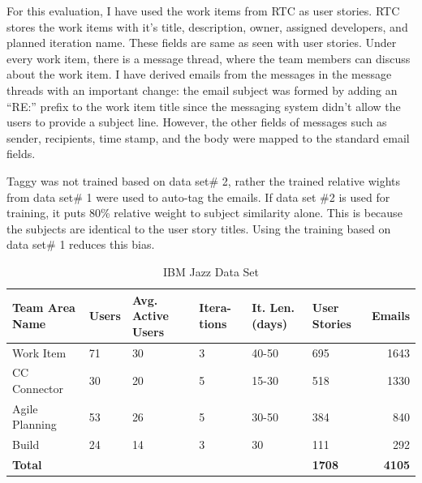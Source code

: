 For this evaluation, I have used the work items from RTC as user stories. RTC stores the work items with it's title, description, owner, assigned developers, and planned iteration name. These fields are same as seen with user stories. Under every work item, there is a message thread, where the team members can discuss about the work item. I have derived emails from the messages in the message threads with an important change: the email subject was formed by adding an ``RE:'' prefix to the work item title since the messaging system didn't allow the users to provide a subject line. However, the other fields of messages such as sender, recipients, time stamp, and the body were mapped to the standard email fields.

Taggy was not trained based on data set\# 2, rather the trained relative wights from data set\# 1 were used to auto-tag the emails. If data set \#2 is used for training, it puts 80\% relative weight to subject similarity alone. This is because the subjects are identical to the user story titles.  Using the training based on data set\# 1 reduces this bias.


\begin{table}[h!]
  \centering
  \caption{IBM Jazz Data Set}
	\label{tab:jazz}
    \begin{tabular}{|p{3cm}|p{1.5cm}|p{1.5cm}|p{1.3cm}|p{2cm}|p{2cm}|r|}
      \hline
      \textbf{Team Area Name} & \textbf{Users} & \textbf{Avg. Active Users} & \textbf{Itera- tions} & \textbf{It. Len. (days)}  & \textbf{User Stories} & \textbf{Emails}\\
      \hline                
      Work Item 			& 71 & 30		& 3 	& 40-50  		& 695 		& 1643 \\
      \hline
      CC Connector 	  & 30 & 20		& 5 	& 15-30 		& 518 	& 1330 \\
      \hline
      Agile Planning 	& 53 & 26 	& 5 	& 30-50 		& 384		& 840 \\
      \hline
      Build 					& 24 & 14		& 3 	& 30 				& 111 	& 292 \\
      \hline
      \textbf{Total} &  &  & &  & \textbf{1708} & \textbf{4105}\\
      \hline
    \end{tabular}
\end{table}

